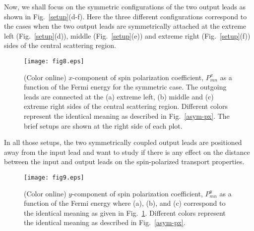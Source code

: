\documentclass[prb,aps,twocolumn,amsmath,amssymb,floatfix,
superscriptaddress]{revtex4}
\begin{document}
Now, we shall focus on the symmetric configurations of the two output
leads as shown in Fig.~\ref{setup}(d-f). Here the three different
configurations correspond to the cases when the two output leads are
symmetrically attached at the extreme left (Fig.~\ref{setup}(d)),
middle (Fig.~\ref{setup}(e)) and extreme right (Fig.~\ref{setup}(f))
sides of the central scattering region.
\begin{figure}[h]
\centering
\texttt{[image: fig8.eps]}
\caption{(Color online) $x$-component of spin polarization
  coefficient, $P^x_{mn}$ as a function of the Fermi energy for the
  symmetric case. The outgoing leads are connected at the (a) extreme
  left, (b) middle and (c) extreme right sides of the central
  scattering region. Different colors represent the identical meaning
  as described in Fig.~\ref{asym-px}. The brief setups are shown at
  the right side of each plot.}
\label{sym-px}
\end{figure}
In all those setups, the two symmetrically coupled output leads are
positioned away from the input lead and want to study if there is any
effect on the distance between the input and output leads on the
spin-polarized transport properties.
\begin{figure}[h]
\centering
\texttt{[image: fig9.eps]}
\caption{(Color online) $y$-component of spin polarization
  coefficient, $P^y_{mn}$ as a function of the Fermi energy where (a),
  (b), and (c) correspond to the identical meaning as given in
  Fig.~\ref{sym-px}. Different colors represent the identical meaning
  as described in Fig.~\ref{asym-px}.}
\label{sym-py}
\end{figure}
\end{document}
